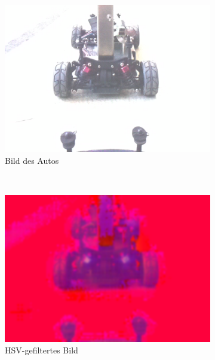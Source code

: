 \documentclass[10pt]{article}
\begin{document}
    \begin{figure}[htbp]
        \centering
        \begin{subfigure}[b]{0.3\textwidth}
            \includegraphics[width=\textwidth]{crob_image}
            \caption{Bild des Autos}\label{fig:car}
        \end{subfigure}~\begin{subfigure}[b]{0.3\textwidth}
            \includegraphics[width=\textwidth]{crob_image_hsv}
            \caption{HSV-gefiltertes Bild}\label{fig:car_hcsv}
        \end{subfigure}~\begin{subfigure}[b]{0.3\textwidth}

\end{subfigure}
\end{figure}
\end{document}
